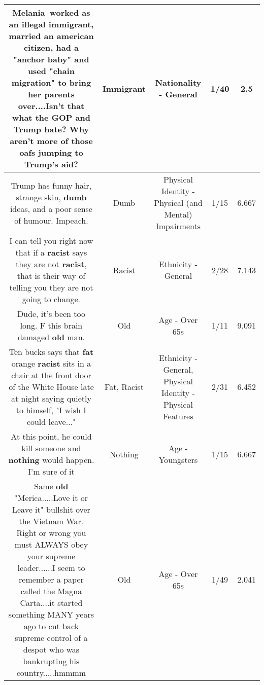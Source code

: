 \documentclass[11pt]{article}
\newlength\mylength
\begin{document}
\begin{center}
\begin{longtable}{|C{.65\mylength}|C{.30\mylength}|C{.12\mylength}|C{.12\mylength}|C{.12\mylength}|}
  \small Melania worked as an illegal \textbf{immigrant}, married an american citizen, had a "anchor baby" and used "chain migration" to bring her parents over....Isn't that what the GOP and Trump hate? Why aren't more of those oafs jumping to Trump's aid?\normalsize   & Immigrant & Nationality - General & 1/40 & 2.5 \\  \hline
  \small Trump has funny hair, strange skin, \textbf{dumb} ideas, and a poor sense of humour. Impeach.\normalsize   & Dumb & Physical Identity - Physical (and Mental) Impairments & 1/15 & 6.667 \\  \hline
  \small I can tell you right now that if a \textbf{racist} says they are not \textbf{racist}, that is their way of telling you they are not going to change.\normalsize   & Racist & Ethnicity - General & 2/28 & 7.143 \\  \hline
  \small Dude, it's been too long. F this brain damaged \textbf{old} man.\normalsize   & Old & Age - Over 65s & 1/11 & 9.091 \\  \hline
  \small Ten bucks says that \textbf{fat} orange \textbf{racist} sits in a chair at the front door of the White House late at night saying quietly to himself, "I wish I could leave..."\normalsize   & Fat, Racist & Ethnicity - General, Physical Identity - Physical Features & 2/31 & 6.452 \\  \hline
  \small At this point, he could kill someone and \textbf{nothing} would happen. I'm sure of it\normalsize   & Nothing & Age - Youngsters & 1/15 & 6.667 \\  \hline
  \small Same \textbf{old} "Merica.....Love it or Leave it" bullshit over the Vietnam War. Right or wrong you must ALWAYS obey your supreme leader......I seem to remember a paper called the Magna Carta....it started something MANY years ago to cut back supreme control of a despot who was bankrupting his country.....hmmmm\normalsize   & Old & Age - Over 65s & 1/49 & 2.041 \\  \hline

\end{longtable}
\end{center}
\end{document}
